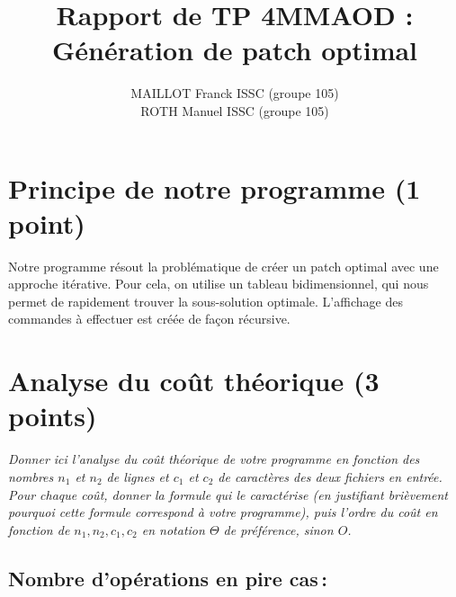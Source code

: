 \documentclass[a4paper, 10pt, english]{article}
\title{Rapport de TP 4MMAOD : Génération de patch optimal}
\author{
MAILLOT Franck ISSC (groupe 105) 
\\ ROTH Manuel ISSC (groupe 105) 
}
\begin{document}
\maketitle


\section{Principe de notre  programme (1 point)}
Notre programme résout la problématique de créer un patch optimal avec une approche itérative. Pour cela, on utilise un tableau bidimensionnel,
qui nous permet de rapidement trouver la sous-solution optimale. L'affichage des commandes à effectuer est créée de fa\c{c}on récursive.

\section{Analyse du coût théorique (3 points)}
{\em Donner ici l'analyse du coût théorique de votre programme en fonction des nombres $n_1$ et $n_2$ de lignes 
et $c_1$ et $c_2$ de caractères des deux fichiers en entrée.
 Pour chaque coût, donner la formule qui le caractérise (en justifiant brièvement pourquoi cette formule correspond à votre programme), 
 puis l'ordre du coût en fonction de $n_1, n_2, c_1, c_2$ en notation $\Theta$ de préférence, sinon $O$.}

  \subsection{Nombre  d'opérations en pire cas\,: }
\end{document}
